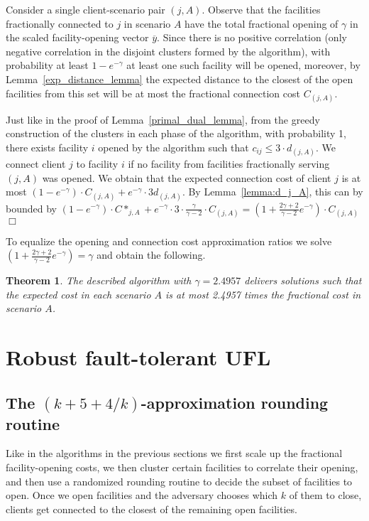 \documentclass[11pt]{article}
\newtheorem{theorem}{Theorem}[section]
\newcommand{\qed}{\nopagebreak \hfill $\Box$}
\newenvironment{proof}{\par \noindent {\em Proof:}}{\qed \par}
\begin{document}
\begin{proof}
Consider a single client-scenario pair $(j,A)$.
Observe that the facilities fractionally connected to $j$ in scenario $A$
have the total fractional opening of $\gamma$ in the scaled facility-opening vector $\overline{y}$.
Since there is no positive correlation (only negative correlation in the disjoint clusters formed 
by the algorithm), with probability at least $1-e^{-\gamma}$ at least one such facility will be opened,
moreover, by Lemma~\ref{exp_distance_lemma} the expected distance to the closest of the open facilities from this set
will be at most the fractional connection cost $C_{(j,A)}$.

Just like in the proof of Lemma~\ref{primal_dual_lemma}, from the greedy construction of the clusters
in each phase of the algorithm, with probability 1, there exists facility $i$ opened 
by the algorithm such that $c_{ij} \leq 3 \cdot d_{(j,A)}$.
We connect client $j$ to facility $i$ if no facility from facilities fractionally serving $(j,A)$ was opened.
We obtain that the expected connection cost of client $j$ is at most $(1-e^{-\gamma}) \cdot C_{(j,A)} + e^{-\gamma} \cdot 3 d_{(j,A)}$.
By Lemma~\ref{lemma:d_j_A}, this can by bounded by  
$(1-e^{-\gamma}) \cdot C*_{j,A} + e^{-\gamma} \cdot 3 \cdot \frac{\gamma}{\gamma-2} \cdot C_{(j,A)} =
(1+\frac{2\gamma+2}{\gamma-2} e^{-\gamma}) \cdot C_{(j,A)}$
\end{proof}

To equalize the opening and connection cost approximation ratios we solve $(1+\frac{2\gamma+2}{\gamma-2} e^{-\gamma}) = \gamma$ and obtain the following.

\begin{theorem}
The described algorithm with $\gamma = 2.4957$ delivers solutions such that the expected cost in each scenario $A$
is at most 2.4957 times the fractional cost in scenario $A$. 
\end{theorem}

\section{Robust fault-tolerant UFL}
\label{app:rft}

\subsection{The $(k+5+4/k)$-approximation rounding routine}
\label{sec:rftfl-general}
Like in the algorithms in the previous sections we first scale up the fractional facility-opening costs,
we then cluster certain facilities to correlate their opening,
and then use a randomized rounding routine to decide the subset of facilities to open.
Once we open facilities and the adversary chooses which $k$ of them to close,
clients get connected to the closest of the remaining open facilities.
\end{document}
